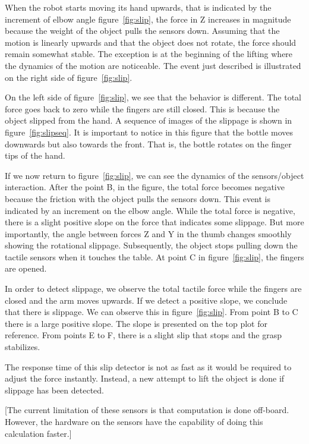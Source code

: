 When the robot starts moving its hand upwards, that is indicated
by the increment of elbow angle figure~\ref{fig:slip}, the force
in Z increases in magnitude because the weight of the object pulls
the sensors down. Assuming that the motion is linearly upwards and
that the object does not rotate, the force should remain somewhat
stable. The exception is at the beginning of the lifting where the
dynamics of the motion are noticeable. The event just described is
illustrated on the right side of figure~\ref{fig:slip}.

On the left side of figure~\ref{fig:slip}, we see that the
behavior is different. The total force goes back to zero while the
fingers are still closed. This is because the object slipped from
the hand. A sequence of images of the slippage is shown in
figure~\ref{fig:slipseq}. It is important to notice in this figure
that the bottle moves downwards but also towards the front. That
is, the bottle rotates on the finger tips of the hand.

If we now return to figure~\ref{fig:slip}, we can see the dynamics
of the sensors/object interaction. After the point B, in the
figure, the total force becomes negative because the friction with
the object pulls the sensors down. This event is indicated by an
increment on the elbow angle. While the total force is negative,
there is a slight positive slope on the force that indicates some
slippage. But more importantly, the angle between forces Z and Y
in the thumb changes smoothly showing the rotational slippage.
Subsequently, the object stops pulling down the tactile sensors
when it touches the table. At point C in figure~\ref{fig:slip},
the fingers are opened.


In order to detect slippage, we observe the total tactile force
while the fingers are closed and the arm moves upwards. If we
detect a positive slope, we conclude that there is slippage. We
can observe this in figure~\ref{fig:slip}. From point B to C there
is a large positive slope. The slope is presented on the top plot
for reference. From points E to F, there is a slight slip that
stops and the grasp stabilizes.

The response time of this slip detector is not as fast as it would
be required to adjust the force instantly. Instead, a new attempt
to lift the object is done if slippage has been detected.

[The current limitation of these sensors is that computation is
done off-board. However, the hardware on the sensors have the
capability of doing this calculation faster.]



